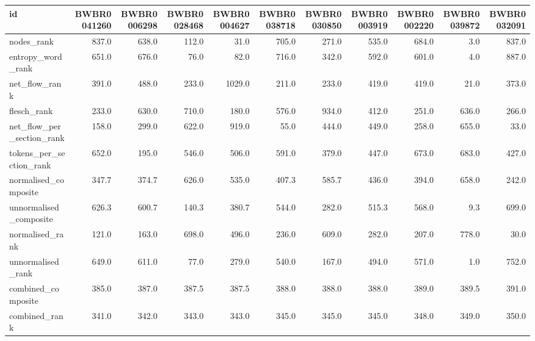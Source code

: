 \begin{tabular}{lrrrrrrrrrr}
\toprule
id & BWBR0041260 & BWBR0006298 & BWBR0028468 & BWBR0004627 & BWBR0038718 & BWBR0030850 & BWBR0003919 & BWBR0002220 & BWBR0039872 & BWBR0032091 \\
\midrule
nodes\_rank & 837.0 & 638.0 & 112.0 & 31.0 & 705.0 & 271.0 & 535.0 & 684.0 & 3.0 & 837.0 \\
\cline{1-11}
entropy\_word\_rank & 651.0 & 676.0 & 76.0 & 82.0 & 716.0 & 342.0 & 592.0 & 601.0 & 4.0 & 887.0 \\
\cline{1-11}
net\_flow\_rank & 391.0 & 488.0 & 233.0 & 1029.0 & 211.0 & 233.0 & 419.0 & 419.0 & 21.0 & 373.0 \\
\cline{1-11}
flesch\_rank & 233.0 & 630.0 & 710.0 & 180.0 & 576.0 & 934.0 & 412.0 & 251.0 & 636.0 & 266.0 \\
\cline{1-11}
net\_flow\_per\_section\_rank & 158.0 & 299.0 & 622.0 & 919.0 & 55.0 & 444.0 & 449.0 & 258.0 & 655.0 & 33.0 \\
\cline{1-11}
tokens\_per\_section\_rank & 652.0 & 195.0 & 546.0 & 506.0 & 591.0 & 379.0 & 447.0 & 673.0 & 683.0 & 427.0 \\
\cline{1-11}
normalised\_composite & 347.7 & 374.7 & 626.0 & 535.0 & 407.3 & 585.7 & 436.0 & 394.0 & 658.0 & 242.0 \\
\cline{1-11}
unnormalised\_composite & 626.3 & 600.7 & 140.3 & 380.7 & 544.0 & 282.0 & 515.3 & 568.0 & 9.3 & 699.0 \\
\cline{1-11}
normalised\_rank & 121.0 & 163.0 & 698.0 & 496.0 & 236.0 & 609.0 & 282.0 & 207.0 & 778.0 & 30.0 \\
\cline{1-11}
unnormalised\_rank & 649.0 & 611.0 & 77.0 & 279.0 & 540.0 & 167.0 & 494.0 & 571.0 & 1.0 & 752.0 \\
\cline{1-11}
combined\_composite & 385.0 & 387.0 & 387.5 & 387.5 & 388.0 & 388.0 & 388.0 & 389.0 & 389.5 & 391.0 \\
\cline{1-11}
combined\_rank & 341.0 & 342.0 & 343.0 & 343.0 & 345.0 & 345.0 & 345.0 & 348.0 & 349.0 & 350.0 \\
\cline{1-11}
\bottomrule
\end{tabular}
